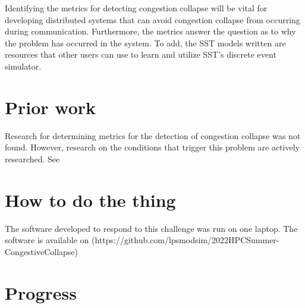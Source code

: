 \documentclass{article}
\begin{document}
Identifying the metrics for detecting congestion collapse will be vital for developing distributed systems that can avoid congestion collapse from occurring during communication. Furthermore, the metrics answer the question as to why the problem has occurred in the system. To add, the SST models written are resources that other users can use to learn and utilize SST's discrete event simulator.

\section{Prior work} %

Research for determining metrics for the detection of congestion collapse was not found. However, research on the conditions that trigger this problem are actively researched. See \cite{https://www.researchgate.net/publication/220428692_Network_Border_Patrol_Preventing_Congestion_Collapse_and_Promoting_Fairness_in_the_Internet}

\section{How to do the thing}

The software developed to respond to this challenge was run on one laptop.
The software is available on (https://github.com/lpsmodsim/2022HPCSummer-CongestiveCollapse)

\section{Progress}
\end{document}

